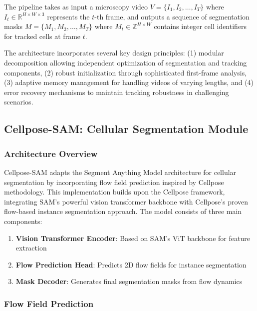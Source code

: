\documentclass[12pt]{article}
\begin{document}
The pipeline takes as input a microscopy video $V = \{I_1, I_2, \ldots, I_T\}$ where $I_t \in \mathbb{R}^{H \times W \times 3}$ represents the $t$-th frame, and outputs a sequence of segmentation masks $M = \{M_1, M_2, \ldots, M_T\}$ where $M_t \in \mathbb{Z}^{H \times W}$ contains integer cell identifiers for tracked cells at frame $t$.

The architecture incorporates several key design principles: (1) modular decomposition allowing independent optimization of segmentation and tracking components, (2) robust initialization through sophisticated first-frame analysis, (3) adaptive memory management for handling videos of varying lengths, and (4) error recovery mechanisms to maintain tracking robustness in challenging scenarios.

\subsection{Cellpose-SAM: Cellular Segmentation Module}

\subsubsection{Architecture Overview}

Cellpose-SAM adapts the Segment Anything Model architecture for cellular segmentation by incorporating flow field prediction inspired by Cellpose methodology. This implementation builds upon the Cellpose framework, integrating SAM's powerful vision transformer backbone with Cellpose's proven flow-based instance segmentation approach. The model consists of three main components:

\begin{enumerate}
  \item \textbf{Vision Transformer Encoder}: Based on SAM's ViT backbone for feature extraction
  \item \textbf{Flow Prediction Head}: Predicts 2D flow fields for instance segmentation
  \item \textbf{Mask Decoder}: Generates final segmentation masks from flow dynamics
\end{enumerate}

\subsubsection{Flow Field Prediction}

\end{document}
